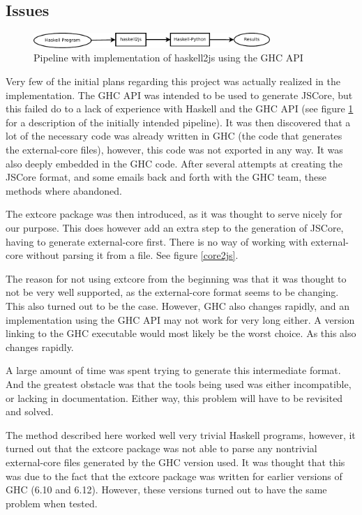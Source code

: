 \subsection{Issues}

\begin{figure}[H]
\centering
\includegraphics[width=0.8\textwidth]{diags/pipe_w_haskell2js}
\caption{Pipeline with implementation of haskell2js using the GHC API}
\label{haskell2js}
\end{figure}

Very few of the initial plans regarding this project was actually realized in the implementation.
The GHC API was intended to be used to generate JSCore, but this failed do to a lack of experience
with Haskell and the GHC API (see figure \ref{haskell2js} for a description of the initially intended
pipeline). It was then discovered that a lot of the necessary code was already
written in GHC (the code that generates the external-core files), however, this code was not 
exported in any way. It was also deeply embedded in the GHC code. After several attempts at creating
the JSCore format, and some emails back and forth with the GHC team, these methods where abandoned.

The extcore package was then introduced, as it was thought to serve nicely for our purpose. This
does however add an extra step to the generation of JSCore, having to generate external-core
first. There is no way of working with external-core without parsing it from a file. See figure \ref{core2js}.

The reason for not using extcore from the beginning was that it was thought to not be very 
well supported, as the external-core format seems to be changing. This also turned out to be
the case. However, GHC also changes rapidly, and an implementation using the GHC API may not
work for very long either. A version linking to the GHC executable would most likely be the
worst choice. As this also changes rapidly.

A large amount of time was spent trying to generate this intermediate format. And the
greatest obstacle was that the tools being used was either incompatible, or lacking in
documentation. Either way, this problem will have to be revisited and solved.

The method described here worked well very trivial Haskell programs, however, 
it turned out that
the extcore package was not able to parse any nontrivial external-core files generated 
by the GHC version used. It was thought that this was due to the fact that the extcore
package was written for earlier versions of GHC (6.10 and 6.12). However, these versions
turned out to have the same problem when tested.

